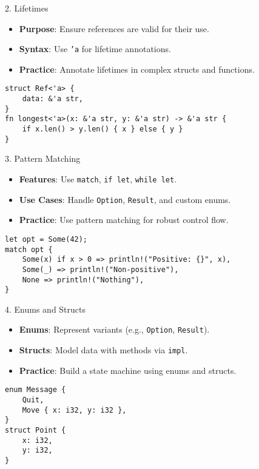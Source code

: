 \documentclass[10pt]{beamer}
\begin{document}
\begin{frame}{2. Lifetimes}
    \begin{itemize}
        \item \textbf{Purpose}: Ensure references are valid for their use.
        \item \textbf{Syntax}: Use \texttt{'a} for lifetime annotations.
        \item \textbf{Practice}: Annotate lifetimes in complex structs and functions.
    \end{itemize}
    \begin{lstlisting}
struct Ref<'a> {
    data: &'a str,
}
fn longest<'a>(x: &'a str, y: &'a str) -> &'a str {
    if x.len() > y.len() { x } else { y }
}
    \end{lstlisting}
\end{frame}

\begin{frame}{3. Pattern Matching}
    \begin{itemize}
        \item \textbf{Features}: Use \texttt{match}, \texttt{if let}, \texttt{while let}.
        \item \textbf{Use Cases}: Handle \texttt{Option}, \texttt{Result}, and custom enums.
        \item \textbf{Practice}: Use pattern matching for robust control flow.
    \end{itemize}
    \begin{lstlisting}
let opt = Some(42);
match opt {
    Some(x) if x > 0 => println!("Positive: {}", x),
    Some(_) => println!("Non-positive"),
    None => println!("Nothing"),
}
    \end{lstlisting}
\end{frame}

\begin{frame}{4. Enums and Structs}
    \begin{itemize}
        \item \textbf{Enums}: Represent variants (e.g., \texttt{Option}, \texttt{Result}).
        \item \textbf{Structs}: Model data with methods via \texttt{impl}.
        \item \textbf{Practice}: Build a state machine using enums and structs.
    \end{itemize}
    \begin{lstlisting}
enum Message {
    Quit,
    Move { x: i32, y: i32 },
}
struct Point {
    x: i32,
    y: i32,
}
    \end{lstlisting}
\end{frame}
\end{document}
